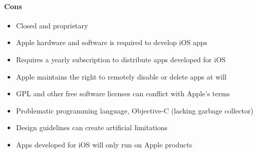 	\paragraph{Cons}
		\begin{itemize}
			\item Closed and proprietary
			\item Apple hardware and software is required to develop iOS apps
			\item Requires a yearly subscription to distribute apps developed
			for iOS
			\item Apple maintains the right to remotely disable or delete apps
			at will
			\item GPL and other free software licenses can conflict with
			Apple's terms
			\item Problematic programming language, Objective-C (lacking garbage collector)
			\item Design guidelines can create artificial limitations
			\item Apps developed for iOS will only run on Apple products
		\end{itemize}



